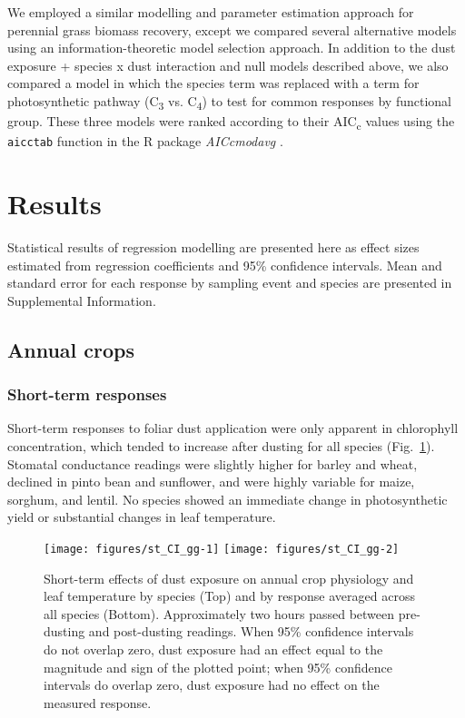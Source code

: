 \documentclass{svjour3}
\begin{document}
We employed a similar modelling and parameter estimation approach for perennial grass biomass recovery, except we compared several alternative models using an information-theoretic model selection approach. 
In addition to the dust exposure + species x dust interaction and null models described above, we also compared a model in which the species term was replaced with a term for photosynthetic pathway (C\textsubscript{3} vs. C\textsubscript{4}) to test for common responses by functional group. 
These three models were ranked according to their AIC\textsubscript{c} values using the \texttt{aicctab} function in the \textsf{R} package \emph{AICcmodavg} \citep{mazerolle2016}. 

\section{Results} 

Statistical results of regression modelling are presented here as effect sizes estimated from regression coefficients and 95\% confidence intervals. 
Mean and standard error for each response by sampling event and species are presented in Supplemental Information. 

\subsection{Annual crops}

\subsubsection{Short-term responses}

Short-term responses to foliar dust application were only apparent in chlorophyll concentration, which tended to increase after dusting for all species (Fig.~\ref{fig:st_cropCIs}). 
Stomatal conductance readings were slightly higher for barley and wheat, declined in pinto bean and sunflower, and were highly variable for maize, sorghum, and lentil. 
No species showed an immediate change in photosynthetic yield or substantial changes in leaf temperature.  

\begin{figure}
	\texttt{[image: figures/st\_CI\_gg-1]}
	\texttt{[image: figures/st\_CI\_gg-2]}
	\caption{Short-term effects of dust exposure on annual crop physiology and leaf temperature by species (Top) and by response averaged across all species (Bottom).
		Approximately two hours passed between pre-dusting and post-dusting readings. 
		When 95\% confidence intervals do not overlap zero, dust exposure had an effect equal to the magnitude and sign of the plotted point; when 95\% confidence intervals do overlap zero, dust exposure had no effect on the measured response. \label{fig:st_cropCIs} }
\end{figure}
\end{document}

